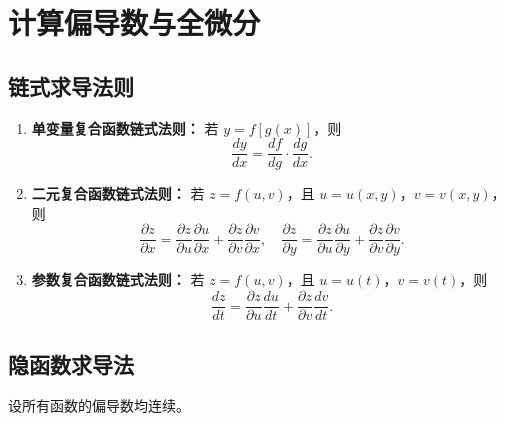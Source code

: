 \section{计算偏导数与全微分}

\subsection{链式求导法则}

\begin{enumerate}
    \item \textbf{单变量复合函数链式法则：}
          若 $y = f[g(x)]$，则
          \[
              \frac{dy}{dx} = \frac{df}{dg} \cdot \frac{dg}{dx}.
          \]

    \item \textbf{二元复合函数链式法则：}
          若 $z = f(u,v)$，且 $u = u(x,y)$，$v = v(x,y)$，则
          \[
              \frac{\partial z}{\partial x} = \frac{\partial z}{\partial u} \frac{\partial u}{\partial x} + \frac{\partial z}{\partial v} \frac{\partial v}{\partial x}, \quad
              \frac{\partial z}{\partial y} = \frac{\partial z}{\partial u} \frac{\partial u}{\partial y} + \frac{\partial z}{\partial v} \frac{\partial v}{\partial y}.
          \]

    \item \textbf{参数复合函数链式法则：}
          若 $z = f(u,v)$，且 $u = u(t)$，$v = v(t)$，则
          \[
              \frac{dz}{dt} = \frac{\partial z}{\partial u} \frac{du}{dt} + \frac{\partial z}{\partial v} \frac{dv}{dt}.
          \]
\end{enumerate}

\subsection{隐函数求导法}

设所有函数的偏导数均连续。

